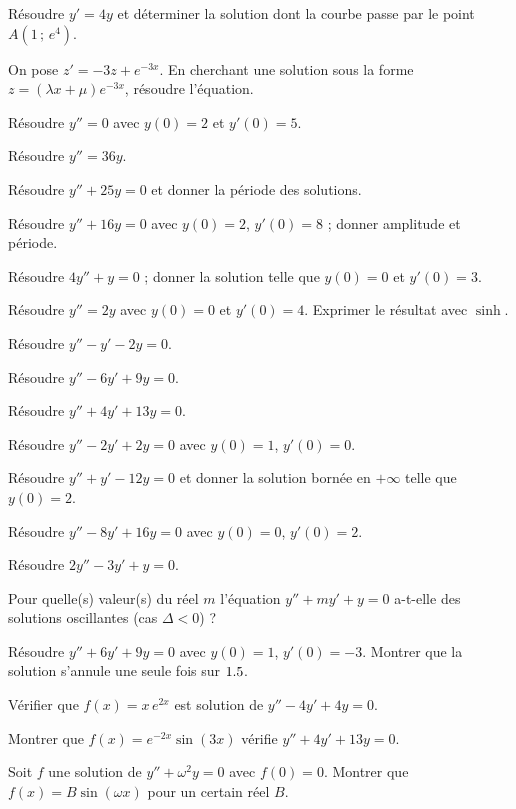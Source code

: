 \exo{} Résoudre $y'=4y$ et déterminer la solution dont la courbe passe
par le point $A(1\,;\,e^{4})$.

\exo{} On pose $z'=-3z+e^{-3x}$. En cherchant une solution sous la forme
$z=(\lambda x+\mu)e^{-3x}$, résoudre l'équation.


\exo{} Résoudre $y''=0$ avec $y(0)=2$ et $y'(0)=5$.

\exo{} Résoudre $y''=36y$.

\exo{} Résoudre $y''+25y=0$ et donner la période des solutions.

\exo{} Résoudre $y''+16y=0$ avec $y(0)=2$, $y'(0)=8$ ; donner amplitude et
période.

\exo{} Résoudre $4y''+y=0$ ; donner la solution telle que $y(0)=0$ et
$y'(0)=3$.

\exo{} Résoudre $y''=2y$ avec $y(0)=0$ et $y'(0)=4$. Exprimer le résultat
avec $\sinh$.


\exo{} Résoudre $y''-y'-2y=0$.

\exo{} Résoudre $y''-6y'+9y=0$.

\exo{} Résoudre $y''+4y'+13y=0$.

\exo{} Résoudre $y''-2y'+2y=0$ avec $y(0)=1$, $y'(0)=0$.

\exo{} Résoudre $y''+y'-12y=0$ et donner la solution bornée en $+\infty$
telle que $y(0)=2$.

\exo{} Résoudre $y''-8y'+16y=0$ avec $y(0)=0$, $y'(0)=2$.

\exo{} Résoudre $2y''-3y'+y=0$.

\exo{} Pour quelle(s) valeur(s) du réel $m$ l'équation
$y''+my'+y=0$ a-t-elle des solutions oscillantes (cas $\Delta<0$) ?

\exo{} Résoudre $y''+6y'+9y=0$ avec $y(0)=1$, $y'(0)=-3$. Montrer que la
solution s'annule une seule fois sur $1.5$.


\exo{} Vérifier que $f(x)=x\,e^{2x}$ est solution de $y''-4y'+4y=0$.

\exo{} Montrer que $f(x)=e^{-2x}\sin(3x)$ vérifie $y''+4y'+13y=0$.

\exo{} Soit $f$ une solution de $y''+\omega^2 y=0$ avec $f(0)=0$. Montrer
que $f(x)=B\sin(\omega x)$ pour un certain réel $B$.

